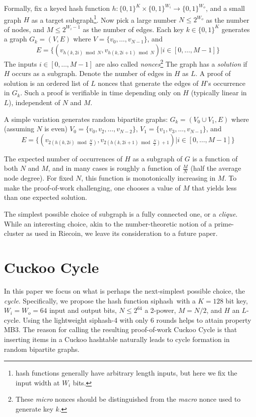 \documentclass[11pt, oneside]{article}
\newcommand{\hash}{{\rm siphash}}
\begin{document}
Formally, fix a keyed hash function
$h: \{0,1\}^K \times \{0,1\}^{W_i} \rightarrow \{0,1\}^{W_o}$,
and a small graph $H$ as a target subgraph\footnote{hash functions generally have arbitrary length inputs,
but here we fix the input width at $W_i$ bits.}.
Now pick a large number $N \leq 2^{W_o}$ as the number of nodes,
and $M \leq 2^{W_i-1}$ as the number of edges.
Each key $k \in \{0,1\}^K$ generates a graph $G_k = (V,E)$ where $V=\{v_0,\ldots,v_{N-1}\}$, and
\begin{equation}
E=\{(v_{h(k,2i) \bmod N},v_{h(k,2i+1) \bmod N}) | i \in [0,\ldots,M-1]\}
\end{equation}
The inputs $i \in [0,\ldots,M-1]$ are also called {\em nonces}\footnote{These
{\em micro} nonces should be distinguished from the {\em macro} nonce used to generate key $k$.}
The graph has a {\em solution} if $H$ occurs as a subgraph.
Denote the number of edges in $H$ as $L$.
A proof of solution is an ordered list of $L$ nonces that generate the edges
of $H$'s occurrence in $G_k$.
Such a proof is verifiable in time depending only on $H$ (typically linear in $L$), independent of $N$ and $M$.

A simple variation generates random bipartite graphs: $G_k = (V_0 \cup V_1,E)$ where (assuming $N$ is even)
$V_0=\{v_0,v_2,\ldots,v_{N-2}\}$, $V_1=\{v_1,v_3,\ldots,v_{N-1}\}$, and
\begin{equation}
\label{hash_edges}
E=\{(v_{2(h(k,2i) \bmod \frac{N}{2})}, v_{2(h(k,2i+1) \bmod \frac{N}{2})+1}) | i \in [0,\ldots,M-1]\}
\end{equation}

The expected number of occurrences of $H$ as a subgraph of $G$ is a function of both $N$ and $M$,
and in many cases is roughly a function of $\frac{M}{N}$ (half the average node degree).
For fixed $N$, this function is monotonically increasing in $M$.
To make the proof-of-work challenging, one chooses a value of $M$ that yields less than one
expected solution.

The simplest possible choice of subgraph is a fully connected one, or a {\em clique}.
While an interesting choice, akin to the number-theoretic notion of a prime-cluster
as used in Riecoin, we leave its consideration to a future paper.

\section{Cuckoo Cycle}
In this paper we focus on what is perhaps the next-simplest possible choice, the {\em cycle}.
Specifically, we propose the hash function \hash\ with a $K=128$ bit key, $W_i = W_o = 64$ input
and output bits, $N \leq 2^{64}$ a 2-power, $M=N/2$, and $H$ an $L$-cycle.
Using the lightweight \hash{}-4 with only 6 rounds helps to attain property MB3.
The reason for calling the resulting proof-of-work Cuckoo Cycle is that
inserting items in a Cuckoo hashtable naturally leads to cycle formation
in random bipartite graphs.
\end{document}

